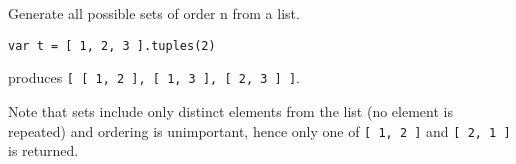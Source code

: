 Generate all possible sets of order n from a list.

\begin{lstlisting}
var t = [ 1, 2, 3 ].tuples(2)
\end{lstlisting}

produces
\texttt{{[}\ {[}\ 1,\ 2\ {]},\ {[}\ 1,\ 3\ {]},\ {[}\ 2,\ 3\ {]}\ {]}}.

Note that sets include only distinct elements from the list (no element
is repeated) and ordering is unimportant, hence only one of
\texttt{{[}\ 1,\ 2\ {]}} and \texttt{{[}\ 2,\ 1\ {]}} is returned.
